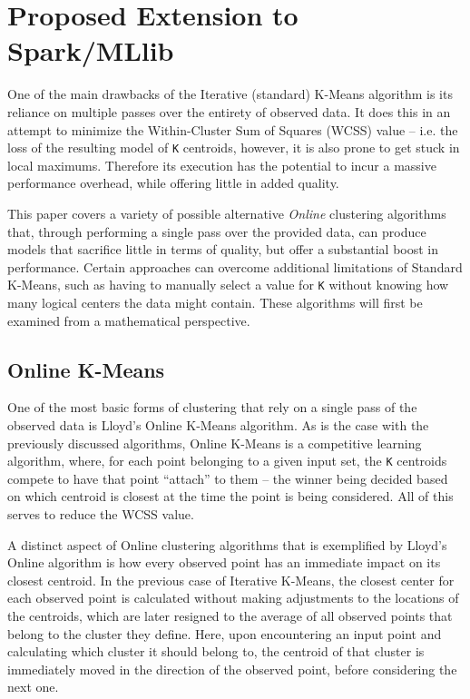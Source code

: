 \documentclass{l4proj}
\begin{document}

\chapter{Proposed Extension to Spark/MLlib}
\label{propose}

One of the main drawbacks of the Iterative (standard) K-Means algorithm is its reliance on  multiple passes over the entirety of observed data. It does this in an attempt to minimize the Within-Cluster Sum of Squares (WCSS) value -- i.e. the loss of the resulting model of \texttt{K} centroids, however, it is also prone to get stuck in local maximums. Therefore its execution has the potential to incur a massive performance overhead, while offering little in added quality.

This paper covers a variety of possible alternative \textit{Online} clustering algorithms that, through performing a single pass over the provided data, can produce models that sacrifice little in terms of quality, but offer a substantial boost in performance. Certain approaches can overcome additional limitations of Standard K-Means, such as having to manually select a value for \texttt{K} without knowing how many logical centers the data might contain. These algorithms will first be examined from a mathematical perspective.

\section{Online K-Means}

One of the most basic forms of clustering that rely on a single pass of the observed data is Lloyd's Online K-Means algorithm. As is the case with the previously discussed algorithms, Online K-Means is a competitive learning algorithm, where, for each point belonging to a given input set, the \texttt{K} centroids compete to have that point ``attach'' to them -- the winner being decided based on which centroid is closest at the time the point is being considered\cite{MLIntro}. All of this serves to reduce the WCSS value.

A distinct aspect of Online clustering algorithms that is exemplified by Lloyd's Online algorithm is how every observed point has an immediate impact on its closest centroid. In the previous case of Iterative K-Means, the closest center for each observed point is calculated without making adjustments to the locations of the centroids, which are later resigned to the average of all observed points that belong to the cluster they define. Here, upon encountering an input point and calculating which cluster it should belong to, the centroid of that cluster is immediately moved in the direction of the observed point, before considering the next one.
\end{document}
